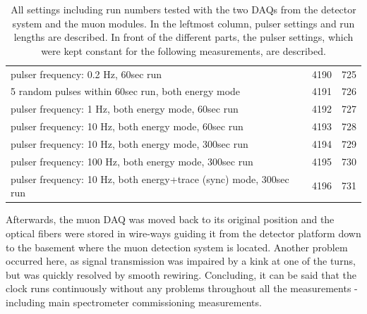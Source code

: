 \begin{table}
\begin{tabularx}{0.9 \textwidth}{|X|cc|}
		\hline
		pulser frequency: 0.2 Hz, 60sec run & 4190 & 725 \\
		5 random pulses within 60sec run, both energy mode & 4191 & 726 \\
		pulser frequency: 1 Hz, both energy mode, 60sec run & 4192 & 727 \\
		pulser frequency: 10 Hz, both energy mode, 60sec run & 4193 & 728 \\
		pulser frequency: 10 Hz, both energy mode, 300sec run & 4194 & 729 \\
		pulser frequency: 100 Hz, both energy mode, 300sec run & 4195 & 730 \\
		pulser frequency: 10 Hz, both energy+trace (sync) mode, 300sec run & 4196 & 731 \\
  		\hline
  	\end{tabularx}
	\caption[Synchronization Test Settings]{All settings including run numbers tested with the two DAQs from the detector system and the muon modules. In the leftmost column, pulser settings and run lengths are described. In front of the different parts, the pulser settings, which were kept constant for the following measurements, are described.}
	\label{tab:syncTests}
  \end{table}

  Afterwards, the muon DAQ was moved back to its original position and the optical fibers were stored in wire-ways guiding it from the detector platform down to the basement where the muon detection system is located. Another problem occurred here, as signal transmission was impaired by a kink at one of the turns, but was quickly resolved by smooth rewiring.
  Concluding, it can be said that the clock runs continuously without any problems throughout all the measurements - including main spectrometer commissioning measurements.

  
